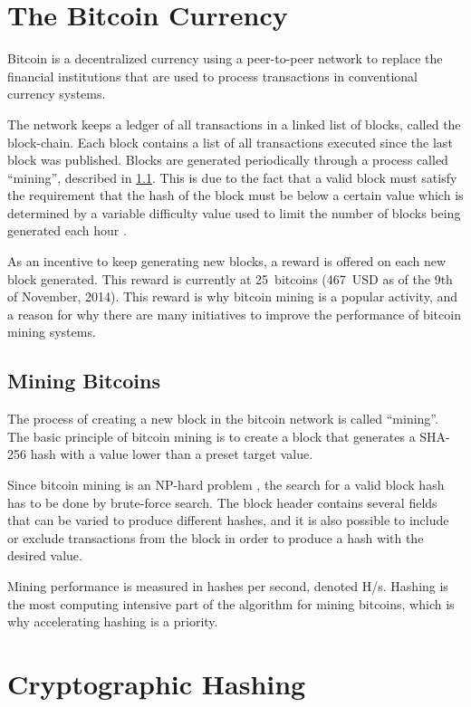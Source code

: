\section{The Bitcoin Currency}
\label{sec:bitcoins}
Bitcoin is a decentralized currency using a peer-to-peer network to replace
the financial institutions that are used to process transactions in conventional
currency systems.

The network keeps a ledger of all transactions in a linked list of blocks, called the
block-chain. Each block contains a list of all transactions executed since the last
block was published. Blocks are generated periodically through a process
called ``mining'', described in \ref{sec:bitcoin-mining}. This is due to the fact that
a valid block must satisfy the requirement that the hash of the block must be below a certain value
which is determined by a variable difficulty value used to limit the number
of blocks being generated each hour \cite{bitcoin}.

As an incentive to keep generating new blocks, a reward is offered on each new block
generated. This reward is currently at 25~bitcoins (467~USD as of the 9th of November, 2014).
This reward is why bitcoin mining is a popular activity, and a reason for why
there are many initiatives to improve the performance of bitcoin mining systems.

\subsection{Mining Bitcoins}
\label{sec:bitcoin-mining}
The process of creating a new block in the bitcoin network is called ``mining''. The basic
principle of bitcoin mining is to create a block that generates a SHA-256 hash with
a value lower than a preset target value.

Since bitcoin mining is an NP-hard problem \cite{bitcoin-np}, the search for a valid block
hash has to be done by brute-force search. The block header contains several fields
that can be varied to produce different hashes, and it is also possible to include
or exclude transactions from the block in order to produce a hash with the desired
value.

Mining performance is measured in hashes per second, denoted H/s. Hashing is the
most computing intensive part of the algorithm for mining bitcoins, which is
why accelerating hashing is a priority.

\section{Cryptographic Hashing}


